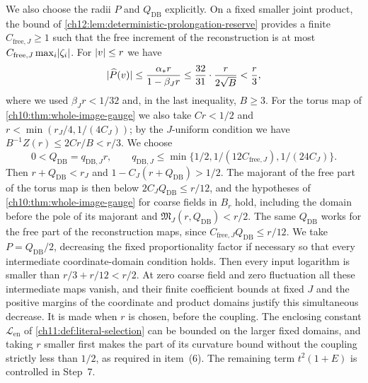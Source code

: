 We also choose the radii $P$ and $Q_{\mathrm{DB}}$ explicitly. On a fixed smaller joint product, the bound of \cref{ch12:lem:deterministic-prolongation-reserve} provides a finite $C_{\mathrm{free},J}\ge1$ such that the free increment of the reconstruction is at most $C_{\mathrm{free},J}\max_i\lvert \zeta_i\rvert$. For $\lvert v\rvert\le r$ we have
\[
 \lvert \widehat P(v)\rvert\le\frac{\alpha_*r}{1-\beta_Jr}\le\frac{32}{31}\cdot\frac{r}{2\sqrt B}<\frac r3,
\]
where we used $\beta_Jr<1/32$ and, in the last inequality, $B\ge3$. For the torus map of \cref{ch10:thm:whole-image-gauge} we also take $Cr<1/2$ and $r<\min(r_J/4,1/(4C_J))$; by the $J$-uniform condition we have $B^{-1}Z(r)\le2Cr/B<r/3$. We choose
\begin{equation}\label{ch20:eq:db-whole-image-gate}
 0<Q_{\mathrm{DB}}=q_{\mathrm{DB},J}r,\qquad q_{\mathrm{DB},J}\le\min\{1/2,1/(12C_{\mathrm{free},J}),1/(24C_J)\}.
\end{equation}
Then $r+Q_{\mathrm{DB}}<r_J$ and $1-C_J(r+Q_{\mathrm{DB}})>1/2$. The majorant of the free part of the torus map is then below $2C_JQ_{\mathrm{DB}}\le r/12$, and the hypotheses of \cref{ch10:thm:whole-image-gauge} for coarse fields in $B_r$ hold, including the domain before the pole of its majorant and $\mathfrak M_J(r,Q_{\mathrm{DB}})<r/2$. The same $Q_{\mathrm{DB}}$ works for the free part of the reconstruction maps, since $C_{\mathrm{free},J}Q_{\mathrm{DB}}\le r/12$. We take $P=Q_{\mathrm{DB}}/2$, decreasing the fixed proportionality factor if necessary so that every intermediate coordinate-domain condition holds. Then every input logarithm is smaller than $r/3+r/12<r/2$. At zero coarse field and zero fluctuation all these intermediate maps vanish, and their finite coefficient bounds at fixed $J$ and the positive margins of the coordinate and product domains justify this simultaneous decrease. It is made when $r$ is chosen, before the coupling. The enclosing constant $\mathscr L_{\mathrm{en}}$ of \cref{ch11:def:literal-selection} can be bounded on the larger fixed domains, and taking $r$ smaller first makes the part of its curvature bound without the coupling strictly less than $1/2$, as required in item~(6). The remaining term $t^2(1+E)$ is controlled in Step~7.

